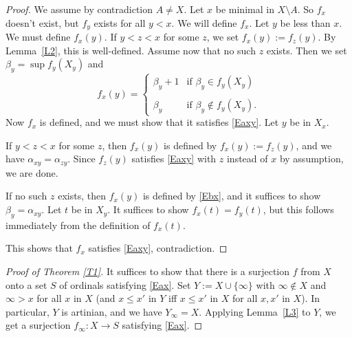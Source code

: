 \documentclass[11pt,letterpaper]{article}
\begin{document}
\begin{proof}
We assume by contradiction $A\ne X$. Let $x$ be minimal in $X\setminus A$. So $f_x$ doesn't exist, but $f_y$ exists for all $y<x$. We will define $f_x$. Let $y$ be less than $x$. We must define $f_x(y)$. If $y<z<x$ for some $z$, we set $f_x(y):=f_z(y)$. By Lemma~\ref{L2}, this is well-defined. Assume now that no such $z$ exists. Then we set $\beta_y=\sup f_y(X_y)$ and
\begin{equation}\label{Ebx}
f_x(y)=
\begin{cases}
\beta_y+1&\text{if }\beta_y\in f_y(X_y)\\ \\ 
\beta_y&\text{if }\beta_y\notin f_y(X_y).
\end{cases}
\end{equation} 
Now $f_x$ is defined, and we must show that it satisfies \eqref{Eaxy}. Let $y$ be in $X_x$. 

If $y<z<x$ for some $z$, then $f_x(y)$ is defined by $f_x(y):=f_z(y)$, and we have $\alpha_{xy}=\alpha_{zy}$. Since $f_z(y)$ satisfies \eqref{Eaxy} with $z$ instead of $x$ by assumption, we are done. 

If no such $z$ exists, then $f_x(y)$ is defined by \eqref{Ebx}, and it suffices to show $\beta_y=\alpha_{xy}$. Let $t$ be in $X_y$. It suffices to show $f_x(t)=f_y(t)$, but this follows immediately from the definition of $f_x(t)$. 

This shows that $f_x$ satisfies \eqref{Eaxy}, contradiction. 
\end{proof} 

\begin{proof}[Proof of Theorem \ref{T1}]  
It suffices to show that there is a surjection $f$ from $X$ onto a set $S$ of ordinals satisfying \eqref{Eax}. Set $Y:=X\cup\{\infty\}$ with $\infty\notin X$ and $\infty>x$ for all $x$ in $X$ (and $x\le x'$ in $Y$ iff $x\le x'$ in $X$ for all $x,x'$ in $X$). In particular, $Y$ is artinian, and we have $Y_\infty=X$. Applying Lemma~\ref{L3} to $Y$, we get a surjection $f_\infty:X\to S$ satisfying \eqref{Eax}. 
\end{proof} 
\end{document}
